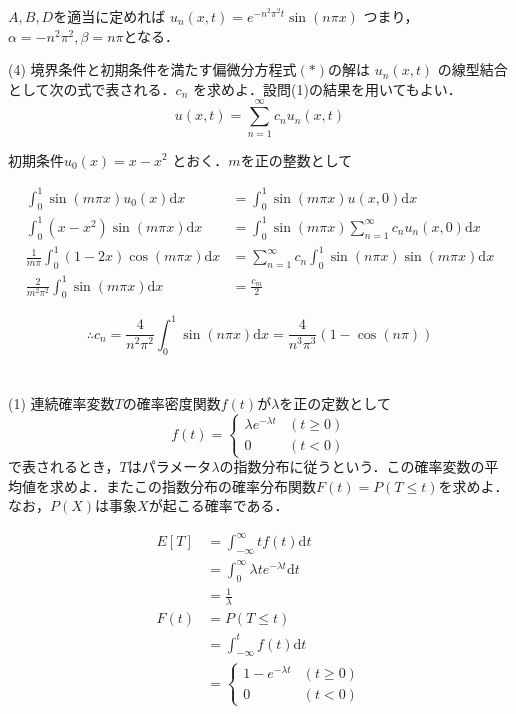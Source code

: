 \documentclass[a4j]{jarticle}
\newcommand{\intd}[1]{
  \mathrm{d} #1
}
\begin{document}
$A,B,D$を適当に定めれば $u_n(x,t) = e^{-n^2\pi^2 t} \sin(n \pi x)$ つまり，$\alpha = -n^2\pi^2, \beta = n \pi$となる．

\begin{screen}
 (4) 境界条件と初期条件を満たす偏微分方程式$(\ast)$の解は $u_n(x,t)$ の線型結合として次の式で表される．$c_n$ を求めよ．設問(1)の結果を用いてもよい．
 $$u(x,t) = \sum_{n=1}^\infty c_n u_n (x,t)$$
\end{screen}

初期条件$u_0 (x) = x-x^2$ とおく．$m$を正の整数として

\begin{align*}
 \int_0^1 \sin(m \pi x)u_0(x) \mathrm{d} x&=  \int_0^1 \sin(m \pi x)u(x,0) \mathrm{d} x \\
 \int_0^1 (x-x^2)\sin(m \pi x) \mathrm{d} x&=  \int_0^1 \sin(m \pi x)\sum_{n=1}^\infty c_n u_n(x,0) \mathrm{d} x \\
 \frac{1}{m\pi} \int_0^1(1-2x)\cos(m \pi x) \mathrm{d}x &= \sum_{n=1}^\infty c_n \int_0^1 \sin(n \pi x) \sin( m \pi x) \mathrm{d} x \\
 \frac{2}{m^2\pi^2}\int_0^1 \sin(m \pi x)\mathrm{d}x&= \frac{c_m}{2}
\end{align*}

$$ \therefore c_n = \frac{4}{n^2\pi^2}\int_0^1 \sin(n \pi x)\mathrm{d}x = \frac{4}{n^3\pi^3}(1-\cos(n \pi))$$

\section{}

\begin{screen}
 (1) 連続確率変数$T$の確率密度関数$f(t)$が$\lambda$を正の定数として
 $$f(t)=\begin{cases}
         \lambda e^{-\lambda t} & (t\geq 0) \\
         0 & (t<0)
        \end{cases}$$
 で表されるとき，$T$はパラメータ$\lambda$の指数分布に従うという．この確率変数の平均値を求めよ．またこの指数分布の確率分布関数$F(t)=P(T \leq t)$を求めよ．なお，$P(X)$は事象$X$が起こる確率である．
\end{screen}

\begin{align*}
 E\left[T\right] &= \int_{-\infty}^{\infty} t f(t) \intd{t} \\
 &= \int_0^\infty \lambda t e^{-\lambda t} \intd{t} \\
 &= \frac{1}{\lambda} \\
 F(t) &= P(T \leq t) \\
 &= \int_{-\infty}^t  f(t) \intd{t} \\
 &=
\begin{cases}
 1  - e^{-\lambda t} &(t \geq 0) \\
 0 &(t<0)
\end{cases}
\end{align*}
\end{document}
